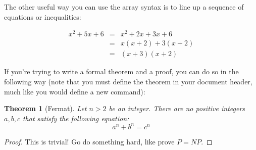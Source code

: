 \documentclass[11pt,letterpaper]{article}
\newtheorem{thm1}{Theorem}
\begin{document}
\pagebreak

The other useful way you can use the array syntax is to line up a sequence of equations or
inequalities:


\begin{eqnarray}
x^2 + 5x + 6 & = & x^2 + 2x + 3x + 6\\
& = & x(x + 2) + 3(x + 2)\label{eqn2}\\
& = & (x + 3)(x + 2)
\end{eqnarray}

If you're trying to write a formal theorem and a proof, you can do so in the following way (note
that you must define the theorem in your document header, much like you would define a new command):

\begin{thm1}[Fermat]\label{thm1}
Let $n > 2$ be an integer.  There are no positive integers $a,b,c$ that satisfy the following 
equation:
\[a^n + b^n = c^n\]
\end{thm1}
\begin{proof}
This is trivial!  Go do something hard, like prove $P = NP$.
\end{proof}

\fi
\end{document}
